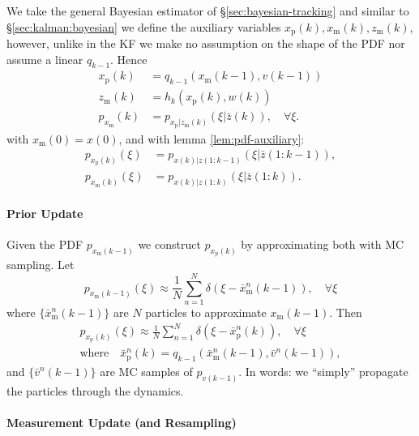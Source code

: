 \documentclass[]{hsrzf}
\theoremstyle{plain}
\theoremstyle{definition}
\theoremstyle{remark}
\begin{document}
We take the general Bayesian estimator of \S\ref{sec:bayesian-tracking} and
similar to \S\ref{sec:kalman:bayesian} we define the auxiliary variables
$x_\mathrm{p}(k), x_\mathrm{m}(k), z_\mathrm{m}(k)$, however, unlike in the KF
we make no assumption on the shape of the PDF nor assume a linear $q_{k-1}$.
Hence
\begin{align*}
  x_\mathrm{p}(k) &= q_{k-1}(x_\mathrm{m}(k-1), v(k-1)) \\
  z_\mathrm{m}(k) &= h_k(x_\mathrm{p}(k), w(k)) \\
  p_{x_\mathrm{m}}(k) &= p_{x_\mathrm{p} | z_\mathrm{m}(k)}(\xi | \bar{z}(k)),
  \quad\forall \xi.
\end{align*}
with $x_\mathrm{m}(0) = x(0)$, and with lemma \ref{lem:pdf-auxiliary}:
\begin{align*}
  p_{x_\mathrm{p}(k)}(\xi) &= p_{x(k)|z(1:k-1)}(\xi | \bar{z}(1:k-1)), \\
  p_{x_\mathrm{m}(k)}(\xi) &= p_{x(k)|z(1:k)}(\xi | \bar{z}(1:k)).
\end{align*}

\paragraph{Prior Update} Given the PDF $p_{x_\mathrm{m}(k-1)}$ we construct
$p_{x_\mathrm{p}(k)}$ by approximating both with MC sampling. Let
\[
  p_{x_\mathrm{m}(k-1)}(\xi) \approx
    \frac{1}{N} \sum_{n=1}^N \delta(\xi - \bar{x}^n_{\mathrm{m}}(k-1)),
    \quad\forall\xi
\]
where $\{\bar{x}^n_{\mathrm{m}}(k-1)\}$ are $N$ particles to approximate
$x_\mathrm{m}(k-1)$. Then
\begin{gather*}
  p_{x_\mathrm{p}(k)}(\xi) \approx
    \frac{1}{N} \sum_{n=1}^N \delta(\xi - \bar{x}^n_{\mathrm{p}}(k)),
    \quad\forall\xi \\
  \text{where} \quad
  \bar{x}^n_{\mathrm{p}}(k)
  = q_{k-1}(\bar{x}^n_{\mathrm{m}}(k-1), \bar{v}^n(k-1)),
\end{gather*}
and $\{\bar{v}^n(k-1)\}$ are MC samples of $p_{v(k-1)}$. In words: we
``simply'' propagate the particles through the dynamics.

\paragraph{Measurement Update (and Resampling)}
\end{document}
